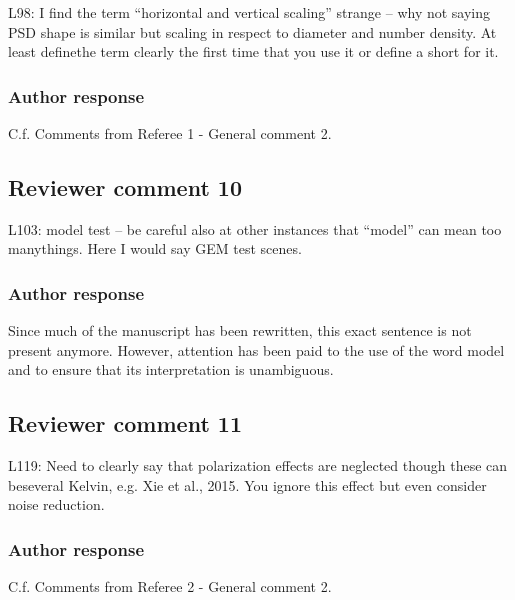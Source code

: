 L98: I find the term “horizontal and vertical scaling” strange – why not saying
PSD shape is similar but scaling in respect to diameter and number density. At
least definethe term clearly the first time that you use it or define a short
for it.

\subsubsection*{Author response}
 
C.f. Comments from Referee 1 - General comment 2.

\subsection*{Reviewer comment 10}

L103: model test – be careful also at other instances that “model” can mean too manythings. Here I would say GEM test scenes.

\subsubsection*{Author response}

Since much of the manuscript has been rewritten, this exact sentence is not
present anymore. However, attention has been paid to the use of the word model
and to ensure that its interpretation is unambiguous.

%


\subsection*{Reviewer comment 11}

L119: Need to clearly say that polarization effects are neglected though these can beseveral Kelvin, e.g.  Xie et al., 2015.  You ignore this effect but even consider noise reduction.


\subsubsection*{Author response}

C.f. Comments from Referee 2 - General comment 2.

